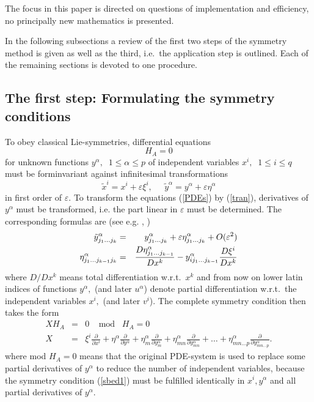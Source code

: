 The focus in this paper is directed on questions of implementation and
efficiency, no principally new mathematics is presented.

In the following subsections a review of the first two steps of the symmetry
method is given as well as the third, i.e.\ the application step is outlined.
Each of the remaining sections is devoted to one procedure.
\subsection{The first step: Formulating the symmetry conditions}

To obey classical Lie-symmetries, differential equations
\begin{equation}
H_A = 0              \label{PDEs}
\end{equation}
for unknown functions $y^\alpha,\;\;1\leq \alpha \leq p$
of independent variables $x^i,\;\;1\leq i \leq q$
must be forminvariant against infinitesimal transformations
\begin{equation}
\tilde{x}^i = x^i + \varepsilon \xi^i, \;\; \;\;\;
        \tilde{y}^\alpha = y^\alpha + \varepsilon \eta^\alpha  \label{tran}
\end{equation}
in first order of $\varepsilon.$ To transform the equations (\ref{PDEs})
by (\ref{tran}), derivatives of $y^\alpha$ must be transformed, i.e. the part
linear in $\varepsilon$ must be determined. The corresponding formulas are
(see e.g. \cite{Olv}, \cite{Step})
\begin{eqnarray}
\tilde{y}^\alpha_{j_1\ldots j_k} & = &
y^\alpha_{j_1\ldots j_k} + \varepsilon
\eta^\alpha_{j_1\ldots j_k} + O(\varepsilon^2)  \nonumber \\ \vspace{3mm}
\eta^\alpha_{j_1\ldots j_{k-1}j_k} & = &
  \frac{D \eta^\alpha_{j_1\ldots j_{k-1}}}{D x^k} -
  y^\alpha_{ij_1\ldots j_{k-1}}\frac{D \xi^i}{D x^k} \label{recur}
\end{eqnarray}
where $D/Dx^k$ means total differentiation w.r.t.\ $x^k$ and
from now on lower latin indices of functions $y^\alpha,$
(and later $u^\alpha$)
denote partial differentiation w.r.t.\ the independent variables $x^i,$
(and later $v^i$).
The complete symmetry condition then takes the form
\begin{eqnarray}
X H_A & = & 0 \;\; \; \; \mbox{mod} \; \; \; H_A = 0\  \label{sbed1} \\
X & = & \xi^i \frac{\partial}{\partial x^i} +
 \eta^\alpha \frac{\partial}{\partial y^\alpha} +
 \eta^\alpha_m \frac{\partial}{\partial y^\alpha_m} +
 \eta^\alpha_{mn} \frac{\partial}{\partial y^\alpha_{mn}} + \ldots +
 \eta^\alpha_{mn\ldots p} \frac{\partial}{\partial y^\alpha_{mn\ldots p}}.
\label{sbed2}
\end{eqnarray}
where mod $H_A = 0$ means that the original PDE-system is used to replace
some partial derivatives of $y^\alpha$ to reduce the number of independent
variables, because the symmetry condition (\ref{sbed1}) must be
fulfilled identically in $x^i, y^\alpha$ and all partial
derivatives of $y^\alpha.$


